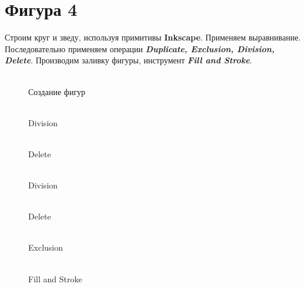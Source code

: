 \newpage
\section[Фигура 4]{Фигура 4}

Строим круг и зведу, используя примитивы \textbf{Inkscape}. 
Применяем выравнивание.
Последовательно применяем операции 
\textit{\textbf{Duplicate, Exclusion, Division, Delete}}.
Производим заливку фигуры, инструмент \textit{\textbf{Fill and Stroke}}.
\begin{figure}[H]
    \begin{minipage}[h]{0.25\linewidth}
        \\Создание фигур
    \end{minipage}
    \hfill
    \begin{minipage}[h]{0.25\linewidth}
        \\Division
    \end{minipage}
    \hfill
    \begin{minipage}[h]{0.25\linewidth}
        \\Delete\\
    \end{minipage}
    \vfill
    \vspace*{1cm}
    \begin{minipage}[h]{0.25\linewidth}
        \\Division
    \end{minipage}    
    \hfill
    \begin{minipage}[h]{0.25\linewidth}
        \\Delete
    \end{minipage}
    \hfill
    \begin{minipage}[h]{0.25\linewidth}
        \\Exclusion
    \end{minipage}
    \vfill
    \vspace*{1cm}
    \centering
    \begin{minipage}[h]{0.25\linewidth}
        \\Fill and Stroke
    \end{minipage}
\end{figure}
